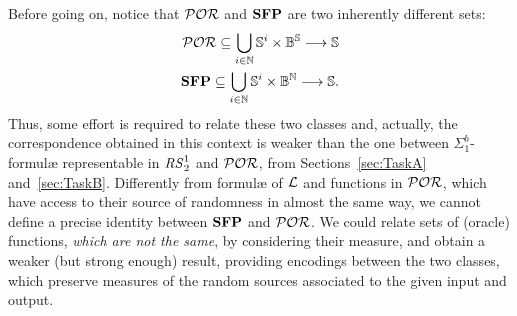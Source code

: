 































































\noindent
Before going on, notice that $\mathcal{POR}$ and $\mathbf{SFP}$
are two inherently different sets:
\begin{align*}
\POR \subseteq \bigcup_{i\in \Nat} \Ss^i \times
\Bool^\Ss \longrightarrow \Ss \\
%
\SFP \subseteq \bigcup_{i\in \Nat} \Ss^i \times
\Bool^\Nat \longrightarrow \Ss.
\end{align*}
%
Thus, some effort is required
to relate these two classes
%
and, actually, %
the correspondence obtained in this
context is weaker than the one between
$\Sigma^b_1$-formul\ae{} representable in
${\mathit{RS}^1_2}$ and $\mathcal{POR}$, from
Sections~\ref{sec:TaskA} and~\ref{sec:TaskB}.
%
Differently from formul\ae{} of $\mathcal{L}$
and functions in $\mathcal{POR}$,
which have access to their source of randomness
in almost the same way,
we cannot define a precise identity between $\mathbf{SFP}$
and $\mathcal{POR}$.
%
We could relate sets of (oracle) functions,
\emph{which are not the same}, by considering
their measure,
and
obtain a weaker (but strong enough) result,
providing encodings between the two classes,
which preserve measures of the random sources
associated to the given input and output.


